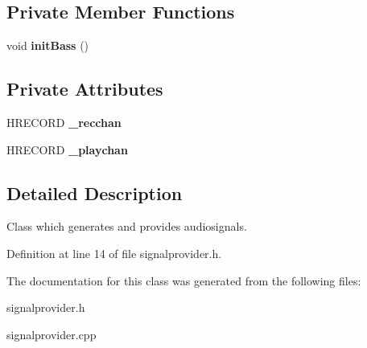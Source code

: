 \subsection*{Private Member Functions}
\begin{DoxyCompactItemize}
\item 
void {\bfseries init\-Bass} ()\label{classSoundfieldViewer_1_1SignalProvider_a763de0f0a99881ba81ae35d9fce6e66b}

\end{DoxyCompactItemize}
\subsection*{Private Attributes}
\begin{DoxyCompactItemize}
\item 
H\-R\-E\-C\-O\-R\-D {\bfseries \-\_\-recchan}\label{classSoundfieldViewer_1_1SignalProvider_aea20f785bc54a77502d0d1fdbba824f5}

\item 
H\-R\-E\-C\-O\-R\-D {\bfseries \-\_\-playchan}\label{classSoundfieldViewer_1_1SignalProvider_a20678def342ba19adffe48c0dcd95e1a}

\end{DoxyCompactItemize}


\subsection{Detailed Description}
Class which generates and provides audiosignals. 



Definition at line 14 of file signalprovider.\-h.



The documentation for this class was generated from the following files\-:\begin{DoxyCompactItemize}
\item 
signalprovider.\-h\item 
signalprovider.\-cpp\end{DoxyCompactItemize}
